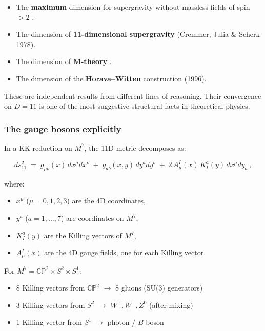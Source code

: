 \documentclass[aps,prd,preprint,superscriptaddress,longbibliography,floatfix]{revtex4-2}
\theoremstyle{remark}
\begin{document}
\begin{itemize}
  \item The \textbf{maximum} dimension for supergravity without massless fields of spin $> 2$ \cite{Nahm1978}.
  \item The dimension of \textbf{11-dimensional supergravity} (Cremmer, Julia \& Scherk 1978).
  \item The dimension of \textbf{M-theory} \cite{Witten1995}.
  \item The dimension of the \textbf{Horava--Witten} construction (1996).
\end{itemize}

These are independent results from different lines of reasoning. Their convergence on $D = 11$ is one of the most suggestive structural facts in theoretical physics.


\subsubsection{The gauge bosons explicitly}

In a KK reduction on $M^7$, the 11D metric decomposes as:


\begin{equation}
    ds^2_{11} \;=\; g_{\mu\nu}(x)\, dx^\mu dx^\nu
\;+\; g_{ab}(x, y)\, dy^a dy^b
\;+\; 2\, A^I_\mu(x)\, K^a_I(y)\, dx^\mu dy_a \,,
\end{equation}

where:

\begin{itemize}
  \item $x^\mu$ ($\mu = 0,1,2,3$) are the 4D coordinates,
  \item $y^a$ ($a = 1, \ldots, 7$) are coordinates on $M^7$,
  \item $K^a_I(y)$ are the Killing vectors of $M^7$,
  \item $A^I_\mu(x)$ are the 4D gauge fields, one for each Killing vector.
\end{itemize}

For $M^7 = \mathbb{CP}^2 \times S^2 \times S^1$:

\begin{itemize}
  \item 8 Killing vectors from $\mathbb{CP}^2$ $\to$ 8 gluons (SU(3) generators)
  \item 3 Killing vectors from $S^2$ $\to$ $W^+, W^-, Z^0$ (after mixing)
  \item 1 Killing vector from $S^1$ $\to$ photon / $B$ boson
\end{itemize}
\end{document}
